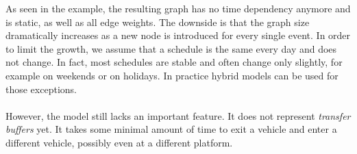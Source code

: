 	As seen in the example, the resulting graph has no time dependency anymore and is static, as well as all edge weights.
	The downside is that the graph size dramatically increases as a new node is introduced for every single event.
	In order to limit the growth, we assume that a schedule is the same every day and does not change. In fact, most schedules are
	stable and often change only slightly, for example on weekends or on holidays. In practice hybrid models can be used for
	those exceptions.\\\\
	However, the model still lacks an important feature. It does not represent \textit{transfer buffers}  yet.
	It takes some minimal amount of time to exit a vehicle and enter a different vehicle, possibly even at a different platform.
	
